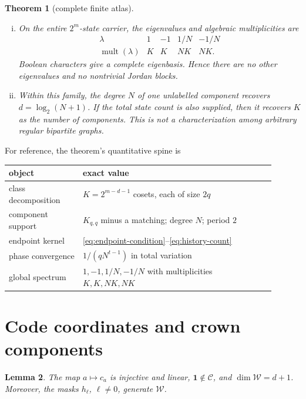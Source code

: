 \documentclass[a4paper,10pt]{amsart}
\newtheorem{theorem}{Theorem}
\newtheorem{lemma}[theorem]{Lemma}
\theoremstyle{remark}
\newcommand{\one}{\mathbf 1}
\newcommand{\cC}{\mathcal C}
\newcommand{\cW}{\mathcal W}
\begin{document}
\begin{theorem}[complete finite atlas]
\begin{enumerate}[(i)]
\item On the entire $2^m$-state carrier, the eigenvalues and algebraic
multiplicities are
\begin{equation}\label{eq:spectrum-table}
\begin{array}{c|cccc}
\lambda&1&-1&1/N&-1/N\\ \hline
\operatorname{mult}(\lambda)&K&K&NK&NK.
\end{array}
\end{equation}
Boolean characters give a complete eigenbasis.  Hence there are no other
eigenvalues and no nontrivial Jordan blocks.

\item Within this family, the degree $N$ of one unlabelled component
recovers $d=\log_2(N+1)$.  If the total state count is also supplied, then
it recovers $K$ as the number of components.  This is not a characterization
among arbitrary regular bipartite graphs.
\end{enumerate}
\end{theorem}

For reference, the theorem's quantitative spine is
\begin{center}
\small
\begin{tabular}{>{\raggedright\arraybackslash}p{0.25\linewidth}
                >{\raggedright\arraybackslash}p{0.65\linewidth}}
\toprule
object & exact value \\
\midrule
class decomposition & $K=2^{m-d-1}$ cosets, each of size $2q$ \\
component support & $K_{q,q}$ minus a matching; degree $N$; period $2$ \\
endpoint kernel & \eqref{eq:endpoint-condition}--\eqref{eq:history-count} \\
phase convergence & $1/(qN^{t-1})$ in total variation \\
global spectrum & $1,-1,1/N,-1/N$ with multiplicities $K,K,NK,NK$ \\
\bottomrule
\end{tabular}
\end{center}

\section{Code coordinates and crown components}

\begin{lemma}\label{lem:code}
The map $a\mapsto c_a$ is injective and linear, $\one\notin\cC$, and
$\dim\cW=d+1$.  Moreover, the masks $h_\ell$, $\ell\ne0$, generate $\cW$.
\end{lemma}
\end{document}

